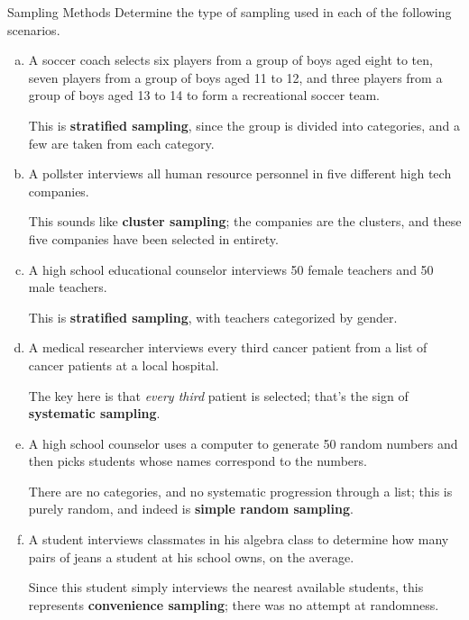 \begin{example}[https://www.youtube.com/watch?v=AkdmTILWkgk&list=PLfmpjsIzhzttL_Uec2nCbDRcAcUF7NKG8&index=4]{Sampling Methods}
Determine the type of sampling used in each of the following scenarios.

\begin{enumerate}[(a)]
\item A soccer coach selects six players from a group of boys aged eight to ten, seven players from a group of boys aged 11 to 12, and three players from a group of boys aged 13 to 14 to form a recreational soccer team.

\sol
This is \textbf{stratified sampling}, since the group is divided into categories, and a few are taken from each category.

\solline
\item A pollster interviews all human resource personnel in five different high tech companies.

\sol
This sounds like \textbf{cluster sampling}; the companies are the clusters, and these five companies have been selected in entirety.

\solline
\item A high school educational counselor interviews 50 female teachers and 50 male teachers.

\sol
This is \textbf{stratified sampling}, with teachers categorized by gender.

\solline
\item A medical researcher interviews every third cancer patient from a list of cancer patients at a local hospital.

\sol
The key here is that \emph{every third} patient is selected; that's the sign of \textbf{systematic sampling}.

\solline
\item A high school counselor uses a computer to generate 50 random numbers and then picks students whose names correspond to the numbers.

\sol
There are no categories, and no systematic progression through a list; this is purely random, and indeed is \textbf{simple random sampling}.

\solline
\item A student interviews classmates in his algebra class to determine how many pairs of jeans a student at his school owns, on the average.

\sol
Since this student simply interviews the nearest available students, this represents \textbf{convenience sampling}; there was no attempt at randomness.
\end{enumerate}
\end{example}
\pagebreak

